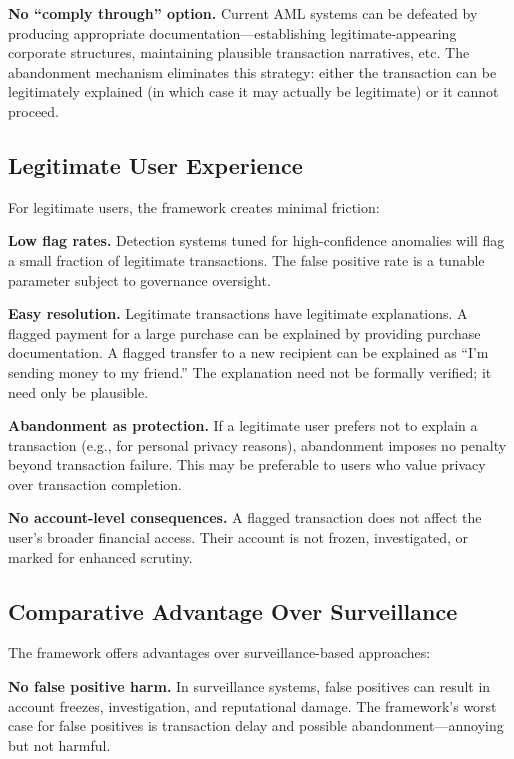 \documentclass[11pt]{article}
\begin{document}
\textbf{No ``comply through'' option.} Current AML systems can be defeated by producing appropriate documentation---establishing legitimate-appearing corporate structures, maintaining plausible transaction narratives, etc. The abandonment mechanism eliminates this strategy: either the transaction can be legitimately explained (in which case it may actually be legitimate) or it cannot proceed.

\subsection{Legitimate User Experience}

For legitimate users, the framework creates minimal friction:

\textbf{Low flag rates.} Detection systems tuned for high-confidence anomalies will flag a small fraction of legitimate transactions. The false positive rate is a tunable parameter subject to governance oversight.

\textbf{Easy resolution.} Legitimate transactions have legitimate explanations. A flagged payment for a large purchase can be explained by providing purchase documentation. A flagged transfer to a new recipient can be explained as ``I'm sending money to my friend.'' The explanation need not be formally verified; it need only be plausible.

\textbf{Abandonment as protection.} If a legitimate user prefers not to explain a transaction (e.g., for personal privacy reasons), abandonment imposes no penalty beyond transaction failure. This may be preferable to users who value privacy over transaction completion.

\textbf{No account-level consequences.} A flagged transaction does not affect the user's broader financial access. Their account is not frozen, investigated, or marked for enhanced scrutiny.

\subsection{Comparative Advantage Over Surveillance}

The framework offers advantages over surveillance-based approaches:

\textbf{No false positive harm.} In surveillance systems, false positives can result in account freezes, investigation, and reputational damage. The framework's worst case for false positives is transaction delay and possible abandonment---annoying but not harmful.
\end{document}
